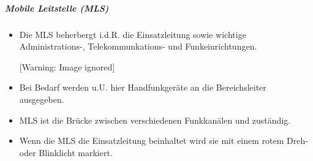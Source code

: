 \documentclass{article}
\begin{document}
\subparagraph{Mobile Leitstelle (MLS)}
\begin{itemize}
\item {\mdseries
Die MLS beherbergt i.d.R. die Einsatzleitung sowie wichtige
Administrations-, Telekommunkations- und Funkeinrichtungen. }

\begin{center}
 [Warning: Image ignored] %

\end{center}
\item {\mdseries
Bei Bedarf werden u.U. hier Handfunkger\"ate an die Bereichsleiter
ausgegeben. }

\item {\mdseries
MLS ist die Br\"ucke zwischen verschiedenen Funkkan\"alen und
zust\"andig. }

\item {\mdseries
Wenn die MLS die Einsatzleitung beinhaltet wird sie mit einem rotem
Dreh- oder Blinklicht markiert. }

\end{itemize}
\end{document}
